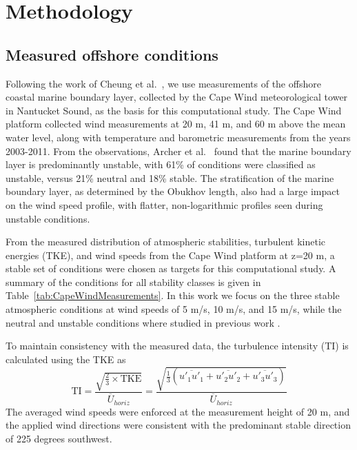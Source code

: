 \section{Methodology}

\subsection{Measured offshore conditions}

Following the work of Cheung et al.~\cite{cheung2020large}, we use
measurements of the offshore coastal marine boundary layer, collected
by the Cape Wind meteorological tower in Nantucket Sound, as the basis
for this computational study.  The Cape Wind platform collected wind
measurements at 20 m, 41 m, and 60 m above the mean water level, along
with temperature and barometric measurements from the years 2003-2011.
From the observations, Archer et al.~\cite{archer2016predominance}
found that the marine boundary layer is predominantly unstable, with
61\% of conditions were classified as unstable, versus 21\% neutral and
18\% stable.  The stratification of the marine boundary layer, as
determined by the Obukhov length, also had a large impact on the wind
speed profile, with flatter, non-logarithmic profiles seen during
unstable conditions.

From the measured distribution of atmospheric stabilities, turbulent
kinetic energies (TKE), and wind speeds from the Cape Wind platform at
z=20 m, a stable set of conditions were chosen as targets for this
computational study.  A summary of the conditions for all stability
classes is given in Table~\ref{tab:CapeWindMeasurements}. In this work we
focus on the three stable atmospheric conditions at wind speeds of
5 m/s, 10 m/s, and 15 m/s, while the neutral and unstable conditions
where studied in previous work \cite{cheung2020large}.

To maintain consistency with the measured data, the turbulence
intensity (TI) is calculated using the TKE as
\begin{equation}
  \textrm{TI} =
  \frac{\sqrt{\frac{2}{3}\times\textrm{TKE}}}{\overline{U}_{horiz}} =
  \frac{\sqrt{\frac{1}{3}\left( \overline{u'_1 u'_1} + \overline{u'_2 u'_2} + \overline{u'_3 u'_3}
      \right)}}{\overline{U}_{horiz}}
\end{equation}
The averaged wind speeds were enforced at the measurement height of
20 m, and the applied wind directions were consistent with the
predominant stable direction of 225 degrees southwest.

